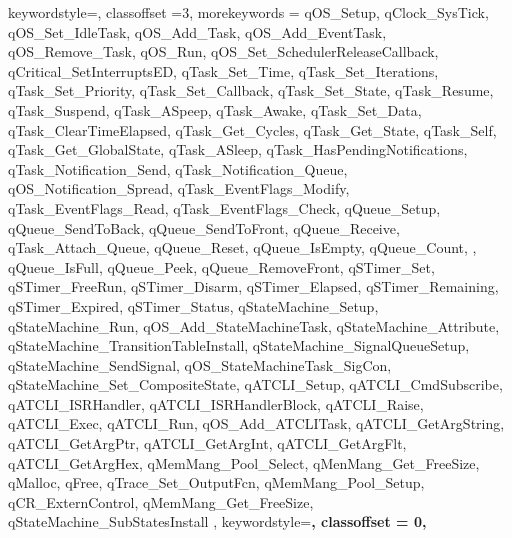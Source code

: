 {    keywordstyle=\color{teal},    
    classoffset =3,
    morekeywords = {qOS_Setup, qClock_SysTick, qOS_Set_IdleTask, qOS_Add_Task, qOS_Add_EventTask, qOS_Remove_Task, qOS_Run, qOS_Set_SchedulerReleaseCallback, qCritical_SetInterruptsED, qTask_Set_Time, qTask_Set_Iterations, qTask_Set_Priority, qTask_Set_Callback, qTask_Set_State, qTask_Resume, qTask_Suspend, qTask_ASpeep, qTask_Awake, qTask_Set_Data, qTask_ClearTimeElapsed, qTask_Get_Cycles, qTask_Get_State, qTask_Self, qTask_Get_GlobalState, qTask_ASleep, qTask_HasPendingNotifications, qTask_Notification_Send, qTask_Notification_Queue, qOS_Notification_Spread, qTask_EventFlags_Modify, qTask_EventFlags_Read, qTask_EventFlags_Check, qQueue_Setup, qQueue_SendToBack, qQueue_SendToFront, qQueue_Receive, qTask_Attach_Queue, qQueue_Reset, qQueue_IsEmpty, qQueue_Count, , qQueue_IsFull, qQueue_Peek, qQueue_RemoveFront, qSTimer_Set, qSTimer_FreeRun, qSTimer_Disarm, qSTimer_Elapsed, qSTimer_Remaining, qSTimer_Expired, qSTimer_Status, qStateMachine_Setup, qStateMachine_Run, qOS_Add_StateMachineTask, qStateMachine_Attribute, qStateMachine_TransitionTableInstall, qStateMachine_SignalQueueSetup, qStateMachine_SendSignal, qOS_StateMachineTask_SigCon, qStateMachine_Set_CompositeState, qATCLI_Setup, qATCLI_CmdSubscribe, qATCLI_ISRHandler, qATCLI_ISRHandlerBlock, qATCLI_Raise, qATCLI_Exec, qATCLI_Run, qOS_Add_ATCLITask, qATCLI_GetArgString, qATCLI_GetArgPtr, qATCLI_GetArgInt, qATCLI_GetArgFlt, qATCLI_GetArgHex, qMemMang_Pool_Select, qMenMang_Get_FreeSize, qMalloc, qFree, qTrace_Set_OutputFcn, qMemMang_Pool_Setup, qCR_ExternControl, qMemMang_Get_FreeSize, qStateMachine_SubStatesInstall },
    keywordstyle=\bfseries,
    classoffset = 0,
}